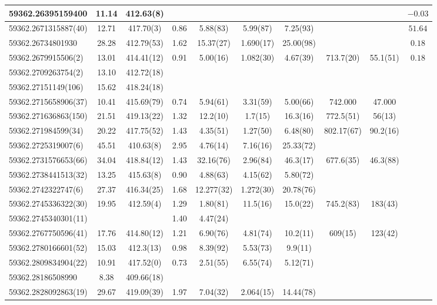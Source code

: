 \documentclass[preprint2, trackchanges]{aastex631}
\begin{document}
{{\begin{longtable}{lccccccccc}
\hline
59362.26395159400 & 11.14 & 412.63(8) &  &  &    &  &  &  & $-0.03$ \\
\hline
59362.2671315887(40) & 12.71 & 417.70(3) & 0.86 & 5.88(83) & 5.99(87)  & 7.25(93) &  &  & $51.64$ \\
\hline
59362.26734801930 & 28.28 & 412.79(53) & 1.62 & 15.37(27) & 1.690(17)  & 25.00(98) &  &  & $0.18$ \\
\hline
59362.2679915506(2) & 13.01 & 414.41(12) & 0.91 & 5.00(16) & 1.082(30)  & 4.67(39) & 713.7(20) & 55.1(51) & $0.18$ \\
\hline
59362.2709263754(2) & 13.10 & 412.72(18) &  &    &  &  &  &  &  \\
\hline
59362.27151149(106) & 15.62 & 418.24(18) &  &    &  &  &  &  &  \\
\hline
59362.2715658906(37) & 10.41 & 415.69(79) & 0.74 & 5.94(61) & 3.31(59)  & 5.00(66) & 742.000 & 47.000 &  \\
\hline
59362.271636863(150) & 21.51 & 419.13(22) & 1.32 & 12.2(10) & 1.7(15)  & 16.3(16) & 772.5(51) & 56(13) &  \\
\hline
59362.271984599(34) & 20.22 & 417.75(52) & 1.43 & 4.35(51) & 1.27(50)  & 6.48(80) & 802.17(67) & 90.2(16) &  \\
\hline
59362.2725319007(6) & 45.51 & 410.63(8) & 2.95 & 4.76(14) & 7.16(16)  & 25.33(72) &  &  &  \\
\hline
59362.2731576653(66) & 34.04 & 418.84(12) & 1.43 & 32.16(76) & 2.96(84)  & 46.3(17) & 677.6(35) & 46.3(88) &  \\
\hline
59362.2738441513(32) & 13.25 & 415.63(8) & 0.90 & 4.88(63) & 4.15(62)  & 5.80(72) &  &  &  \\
\hline
59362.2742322747(6) & 27.37 & 416.34(25) & 1.68 & 12.277(32) & 1.272(30)  & 20.78(76) &  &  &  \\
\hline
59362.2745336322(30)  & 19.95 & 412.59(4) & 1.29 & 1.80(81) & 11.5(16)  & 15.0(22) & 745.2(83) & 183(43) &  \\
59362.2745340301(11)  &  &  & 1.40 & 4.47(24) &  &  &  &  &  \\
\hline
59362.2767750596(41) & 17.76 & 414.80(12) & 1.21 & 6.90(76) & 4.81(74)  & 10.2(11) & 609(15) & 123(42) &  \\
\hline
59362.2780166601(52) & 15.03 & 412.3(13) & 0.98 & 8.39(92) & 5.53(73)  & 9.9(11) &  &  &  \\
\hline
59362.2809834904(22) & 10.91 & 417.52(0) & 0.73 & 2.51(55) & 6.55(74)  & 5.12(71) &  &  &  \\
\hline
59362.28186508990 & 8.38 & 409.66(18) &  &  &  &  &  &   &  \\
\hline
59362.2828092863(19) & 29.67 & 419.09(39) & 1.97 & 7.04(32) & 2.064(15)  & 14.44(78) &  &  &  \\
\hline

\end{longtable}
}}
\end{document}
